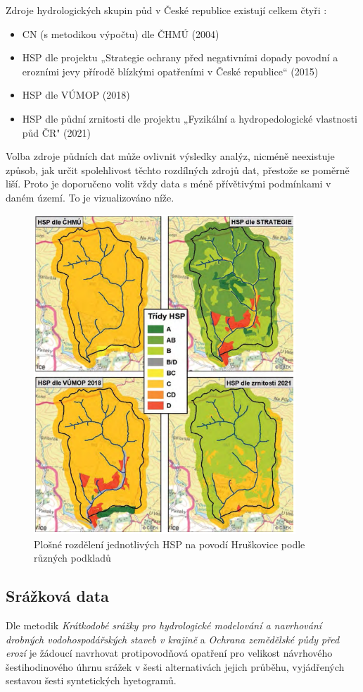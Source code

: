 \documentclass[a4paper,oneside,12pt]{book}
\begin{document}
Zdroje hydrologických skupin půd v České republice existují celkem čtyři \cite{Strouhal2022}:
\begin{itemize}
\item CN (s metodikou výpočtu) dle ČHMÚ (2004)
\item HSP dle projektu „Strategie ochrany před negativními dopady povodní a erozními jevy přírodě blízkými opatřeními v České republice“ (2015)
\item HSP dle VÚMOP (2018) 
\item HSP dle půdní zrnitosti dle projektu „Fyzikální a hydropedologické vlastnosti půd ČR" (2021)
\end{itemize}
\hspace{10mm} Volba zdroje půdních dat může ovlivnit výsledky analýz, nicméně neexistuje způsob, jak určit spolehlivost těchto rozdílných zdrojů dat, přestože se poměrně liší.\cite{Strouhal2022} Proto je doporučeno volit vždy data s méně přívětivými podmínkami v daném území. \cite{MNYDGwleJOjKdRUp} To je vizualizováno níže.

\begin{figure}[H] \label{obr4}
\centering
\includegraphics[height=12cm]{pictures/HSPmapa.png}
\caption{Plošné rozdělení jednotlivých HSP na povodí Hruškovice podle různých podkladů \cite{Strouhal2022}}
\label{fig:hsp}
\end{figure}

\newpage
\subsection{Srážková data} \label{rain}
\hspace{10mm} Dle metodik \textit{Krátkodobé srážky pro hydrologické modelování a navrhování drobných vodohospodářských staveb v krajině} \cite{MNYDGwleJOjKLRU2} a \textit{Ochrana zemědělské půdy před erozí} \cite{MNYDGwleJOjKdRUp} je žádoucí navrhovat protipovodňová opatření pro velikost návrhového šestihodinového úhrnu srážek v šesti alternativách jejich průběhu, vyjádřených sestavou šesti syntetických hyetogramů. 
\end{document}
